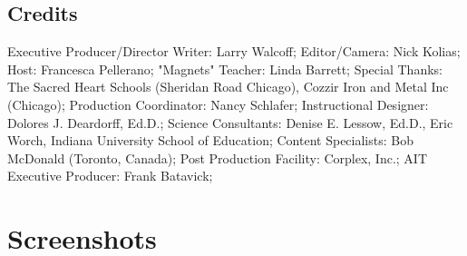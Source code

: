 \subsection{Credits}

Executive Producer/Director Writer: Larry Walcoff;
Editor/Camera: Nick Kolias;
Host: Francesca Pellerano;
"Magnets" Teacher: Linda Barrett;
Special Thanks: The Sacred Heart Schools (Sheridan Road Chicago), Cozzir Iron and Metal Inc (Chicago);
Production Coordinator: Nancy Schlafer;
Instructional Designer: Dolores J. Deardorff, Ed.D.;
Science Consultants: Denise E. Lessow, Ed.D., Eric Worch, Indiana University School of Education;
Content Specialists: Bob McDonald (Toronto, Canada);
Post Production Facility: Corplex, Inc.;
AIT Executive Producer: Frank Batavick;

\clearpage
\newpage

\section{Screenshots}

